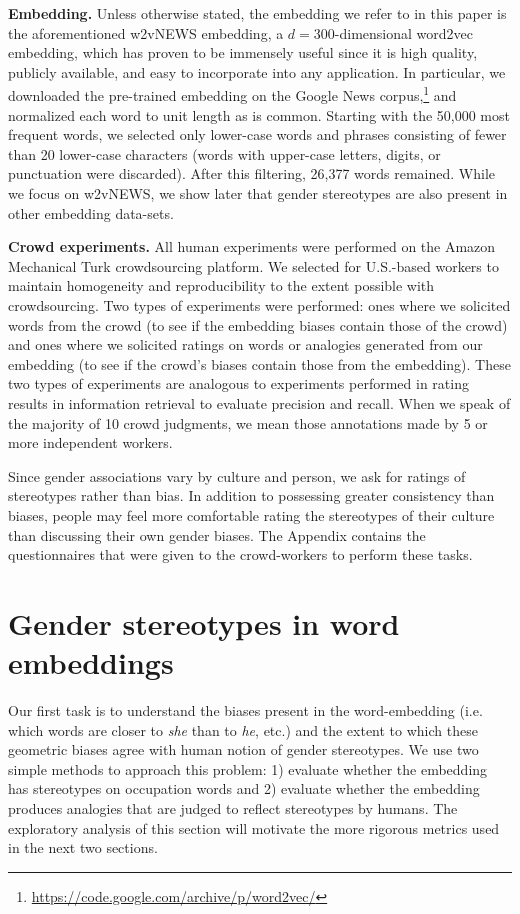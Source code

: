 \documentclass{article}
\begin{document}
\smallskip
\noindent
{\bf Embedding.}
Unless otherwise stated, the embedding we refer to in this paper is the aforementioned w2vNEWS embedding, a $d=300$-dimensional word2vec~\cite{MCCD13,MSCCD13} embedding, which has proven to be immensely useful since it is high quality, publicly available, and easy to incorporate into any application. In particular, we downloaded the pre-trained embedding on the Google News corpus,\footnote{\url{https://code.google.com/archive/p/word2vec/}} and normalized each word to unit length as is common. Starting with the 50,000 most frequent words, we selected only lower-case words and phrases consisting of fewer than 20 lower-case characters (words with upper-case letters, digits, or punctuation were discarded). After this filtering, 26,377 words remained. While we focus on w2vNEWS, we show later that gender stereotypes are also present in other embedding data-sets. 

\smallskip
\noindent
{\bf Crowd experiments.}
All human experiments were performed on the Amazon Mechanical Turk crowdsourcing platform. We selected for U.S.-based workers to maintain homogeneity and reproducibility to the extent possible with crowdsourcing. Two types of experiments were performed: ones where we solicited words from the crowd (to see if the embedding biases contain those of  the crowd) and ones where we solicited ratings on words or analogies generated from our embedding (to see if the crowd's biases contain those from the embedding). These two types of experiments are analogous to experiments performed in rating results in information retrieval to evaluate precision and recall. When we speak of the majority of 10 crowd judgments, we mean those annotations made by 5 or more independent workers.

Since gender associations vary by culture and person, we ask for ratings of stereotypes rather than bias. In addition to possessing greater consistency than biases, people may feel more comfortable rating the stereotypes of their culture than discussing their own gender biases. The Appendix contains the questionnaires that were given to the crowd-workers to perform these tasks.

\section{Gender stereotypes in word embeddings}\label{sec:empiricalbias}

Our first task is to understand the biases present in the word-embedding (i.e. which words are closer to \emph{she} than to \emph{he}, etc.) 
and the extent to which these geometric biases agree with human notion of gender stereotypes. We use two simple methods to approach this problem: 1) evaluate whether the embedding has stereotypes on occupation words and 2) evaluate whether the embedding produces analogies that are judged to reflect stereotypes by humans. The exploratory analysis of this section will motivate the more rigorous metrics used in the next two sections. 
\end{document}
